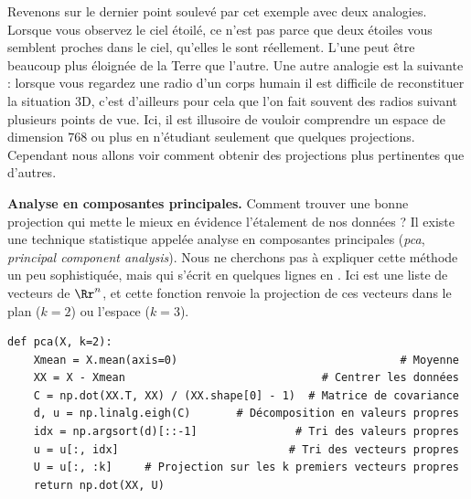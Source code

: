 \documentclass[11pt,class=report,crop=false]{standalone}
\begin{document}
Revenons sur le dernier point soulevé par cet exemple avec deux analogies.
Lorsque vous observez le ciel étoilé, ce n'est pas parce que deux étoiles vous semblent proches dans le ciel, qu'elles le sont réellement. L'une peut être beaucoup plus éloignée de la Terre que l'autre. 
Une autre analogie est la suivante : lorsque vous regardez une radio d'un corps humain il est difficile de reconstituer la situation 3D, c'est d'ailleurs pour cela que l'on fait souvent des radios suivant plusieurs points de vue. 
Ici, il est illusoire de vouloir comprendre un espace de dimension $768$ ou plus en n'étudiant seulement que quelques projections.
Cependant nous allons voir comment obtenir des projections plus pertinentes que d'autres.


\bigskip


\textbf{Analyse en composantes principales.}
Comment trouver une bonne projection qui mette le mieux en évidence l'étalement de nos données ? Il existe une technique statistique appelée analyse en composantes principales (\emph{pca}, \emph{principal component analysis}). 
Nous ne cherchons pas à expliquer cette méthode un peu sophistiquée, mais qui s'écrit en quelques lignes en \Python{}. Ici  est une liste  de vecteurs de $\Rr^n$, et cette fonction renvoie la projection de ces vecteurs dans le plan ($k=2$) ou l'espace ($k=3$).

\begin{center}
\begin{lstlisting}
def pca(X, k=2):
	Xmean = X.mean(axis=0)                                  # Moyenne
	XX = X - Xmean                              # Centrer les données	
	C = np.dot(XX.T, XX) / (XX.shape[0] - 1)  # Matrice de covariance	
	d, u = np.linalg.eigh(C)       # Décomposition en valeurs propres	
	idx = np.argsort(d)[::-1]               # Tri des valeurs propres	
	u = u[:, idx]                          # Tri des vecteurs propres	
	U = u[:, :k]     # Projection sur les k premiers vecteurs propres
	return np.dot(XX, U)
\end{lstlisting}
\end{center}
\end{document}
